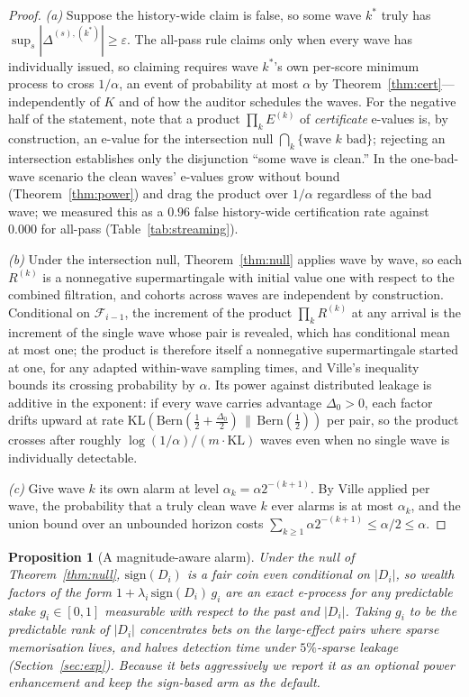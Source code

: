 \documentclass[pdflatex,sn-mathphys-num]{sn-jnl}
\theoremstyle{thmstyleone}
\newtheorem{proposition}[theorem]{Proposition}
\theoremstyle{thmstyletwo}
\theoremstyle{thmstylethree}
\newcommand{\F}{\mathcal{F}}
\newcommand{\KL}{\mathrm{KL}}
\newcommand{\Bern}{\mathrm{Bern}}
\newcommand{\eps}{\varepsilon}
\begin{document}
\begin{proof}
\emph{(a)} Suppose the history-wide claim is false, so some wave $k^\ast$ truly has
$\sup_s |\Delta^{(s),(k^\ast)}| \ge \eps$. The all-pass rule claims only when every
wave has individually issued, so claiming requires wave $k^\ast$'s own per-score
minimum process to cross $1/\alpha$, an event of probability at most $\alpha$ by
Theorem~\ref{thm:cert}---independently of $K$ and of how the auditor schedules the
waves. For the negative half of the statement, note that a product
$\prod_k E^{(k)}$ of \emph{certificate} e-values is, by construction, an e-value for
the intersection null $\bigcap_k \{\text{wave } k \text{ bad}\}$; rejecting an
intersection establishes only the disjunction ``some wave is clean.'' In the
one-bad-wave scenario the clean waves' e-values grow without bound
(Theorem~\ref{thm:power}) and drag the product over $1/\alpha$ regardless of the bad
wave; we measured this as a $0.96$ false history-wide certification rate against
$0.000$ for all-pass (Table~\ref{tab:streaming}).

\emph{(b)} Under the intersection null, Theorem~\ref{thm:null} applies wave by wave,
so each $R^{(k)}$ is a nonnegative supermartingale with initial value one with respect
to the combined filtration, and cohorts across waves are independent by construction.
Conditional on $\F_{i-1}$, the increment of the product
$\prod_k R^{(k)}$ at any arrival is the increment of the single wave whose pair is
revealed, which has conditional mean at most one; the product is therefore itself a
nonnegative supermartingale started at one, for any adapted within-wave sampling times,
and Ville's inequality bounds its crossing probability by $\alpha$. Its power against
distributed leakage is additive in the exponent: if every wave carries advantage
$\Delta_0 > 0$, each factor drifts upward at rate
$\KL(\Bern(\tfrac12 + \tfrac{\Delta_0}2) \,\|\, \Bern(\tfrac12))$ per pair, so the
product crosses after roughly $\log(1/\alpha)/(m \cdot \KL)$ waves even when no single
wave is individually detectable.

\emph{(c)} Give wave $k$ its own alarm at level $\alpha_k = \alpha 2^{-(k+1)}$. By
Ville applied per wave, the probability that a truly clean wave $k$ ever alarms is at
most $\alpha_k$, and the union bound over an unbounded horizon costs
$\sum_{k \ge 1} \alpha 2^{-(k+1)} \le \alpha/2 \le \alpha$.
\end{proof}

\begin{proposition}[A magnitude-aware alarm]\label{prop:magnitude}
Under the null of Theorem~\ref{thm:null}, $\mathrm{sign}(D_i)$ is a fair coin even
conditional on $|D_i|$, so wealth factors of the form $1 + \lambda_i\,\mathrm{sign}(D_i)\,g_i$
are an exact e-process for any predictable stake $g_i \in [0,1]$ measurable with respect
to the past and $|D_i|$. Taking $g_i$ to be the predictable rank of $|D_i|$ concentrates
bets on the large-effect pairs where sparse memorisation lives, and halves detection
time under $5\%$-sparse leakage (Section~\ref{sec:exp}). Because it bets aggressively we
report it as an optional power enhancement and keep the sign-based arm as the default.
\end{proposition}
\end{document}
